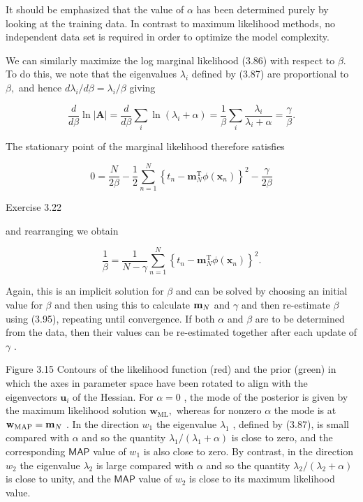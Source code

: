 \documentclass[
  10
]{article}
\begin{document}
It should be emphasized that the value of \(\alpha\) has been determined
purely by looking at the training data. In contrast to maximum
likelihood methods, no independent data set is required in order to
optimize the model complexity.

We can similarly maximize the log marginal likelihood (3.86) with
respect to \(\beta .\) To do this, we note that the eigenvalues
\(\lambda _ { i }\) defined by (3.87) are proportional to \(\beta ,\)
and hence \(d \lambda _ { i } / d \beta = \lambda _ { i } / \beta\)
giving

\[
{\frac {d}{d \beta}} \ln | {\mathbf A} | = {\frac {d}{d \beta}} \sum_ {i} \ln (\lambda_ {i} + \alpha) = {\frac {1}{\beta}} \sum_ {i} {\frac {\lambda_ {i}}{\lambda_ {i} + \alpha}} = {\frac {\gamma}{\beta}}.\tag{3.93}
\]

The stationary point of the marginal likelihood therefore satisfies

\[
0 = \frac {N}{2 \beta} - \frac {1}{2} \sum_ {n = 1} ^ {N} \left\{t _ {n} - \mathbf {m} _ {N} ^ {\mathrm{T}} \phi (\mathbf {x} _ {n}) \right\} ^ {2} - \frac {\gamma}{2 \beta}\tag{3.94}
\]

Exercise 3.22

and rearranging we obtain

\[
\frac {1}{\beta} = \frac {1}{N - \gamma} \sum_ {n = 1} ^ {N} \left\{t _ {n} - \mathbf {m} _ {N} ^ {\mathrm{T}} \phi (\mathbf {x} _ {n}) \right\} ^ {2}.\tag{3.95}
\]

Again, this is an implicit solution for \(\beta\) and can be solved by
choosing an initial value for \(\beta\) and then using this to calculate
\({ \bf m } _ { N }\) and \(\gamma\) and then re-estimate \(\beta\)
using (3.95), repeating until convergence. If both \(\alpha\) and
\(\beta\) are to be determined from the data, then their values can be
re-estimated together after each update of \(\gamma\) .

Figure 3.15 Contours of the likelihood function (red) and the prior
(green) in which the axes in parameter space have been rotated to align
with the eigenvectors \(\mathbf { u } _ { i }\) of the Hessian. For
\(\alpha = 0\) , the mode of the posterior is given by the maximum
likelihood solution \(\mathbf { w } _ { \mathrm { M L } } ,\) whereas
for nonzero \(\alpha\) the mode is at
\({ \bf w } _ { \mathrm { M A P } } = { \bf m } _ { N }\) . In the
direction \(w _ { 1 }\) the eigenvalue \(\lambda _ { 1 }\) , defined by
(3.87), is small compared with \(\alpha\) and so the quantity
\(\lambda _ { 1 } / ( \lambda _ { 1 } + \alpha )\) is close to zero, and
the corresponding \(\mathsf { M A P }\) value of \(w _ { 1 }\) is also
close to zero. By contrast, in the direction \(w _ { 2 }\) the
eigenvalue \(\lambda _ { 2 }\) is large compared with \(\alpha\) and so
the quantity \(\lambda _ { 2 } / ( \lambda _ { 2 } + \alpha )\) is close
to unity, and the \({ \mathsf { M A P } }\) value of \(w _ { 2 }\) is
close to its maximum likelihood value.
\end{document}
